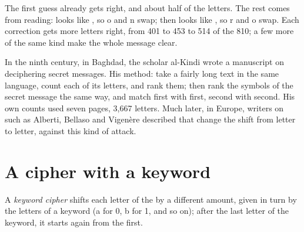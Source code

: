 \label{out:g9:first-cryptography:guess}

The first guess already gets  right, and about half of the letters.
The rest comes from reading:  looks like
, so o and n swap; then  looks like
, so r and o swap. Each correction gets more letters right, from
401 to 453 to 514 of the 810; a few more of the same kind make the whole
message clear.

\begin{history}
In the ninth century, in Baghdad, the scholar al-Kindi wrote a manuscript on
deciphering secret messages. His method: take a fairly long text in the same
language, count each of its letters, and rank them; then rank the symbols of
the secret message the same way, and match first with first, second with
second. His own counts used seven pages, 3,667 letters. Much later, in Europe,
writers on  such as Alberti, Bellaso and Vigenère described  that
change the shift from letter to letter, against this kind of attack.
\end{history}

\section{A cipher with a keyword}

\begin{definition}\label{def:g9:first-cryptography:keyword-cipher}
A \emph{keyword cipher} shifts each letter of the 
by a different amount, given in turn by the letters of a keyword (a for 0, b for
1, and so on); after the last letter of the keyword, it starts again from the
first.
\end{definition}


